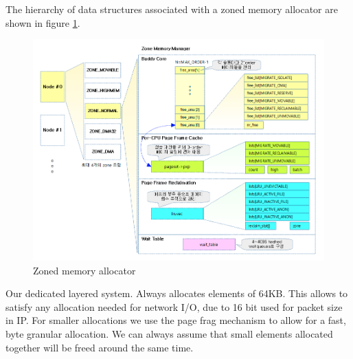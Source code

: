 The hierarchy of data structures associated with a zoned memory allocator are shown in figure \ref{fig:zoned_memory_alloc}.
\begin{figure}
    \centering
    \includegraphics[width=1\textwidth]{figures/zoned_memory.png}
    \caption{Zoned memory allocator}
    \label{fig:zoned_memory_alloc}
\end{figure}

Our dedicated layered \oursys system. Always allocates elements of 64KB.
This allows to satisfy any allocation needed for network I/O, due to 16 bit used for packet size in IP. For smaller allocations we use the page frag mechanism to allow for a fast, byte granular allocation. We can always assume that small elements allocated together will be freed around the same time. 